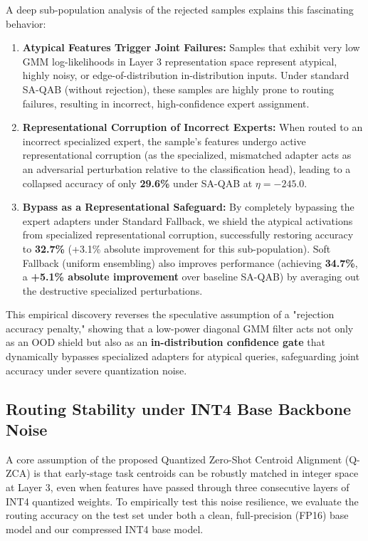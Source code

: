 \documentclass{article}
\theoremstyle{plain}
\theoremstyle{definition}
\theoremstyle{remark}
\begin{document}
A deep sub-population analysis of the rejected samples explains this fascinating behavior:
\begin{enumerate}
    \item \textbf{Atypical Features Trigger Joint Failures:} Samples that exhibit very low GMM log-likelihoods in Layer 3 representation space represent atypical, highly noisy, or edge-of-distribution in-distribution inputs. Under standard SA-QAB (without rejection), these samples are highly prone to routing failures, resulting in incorrect, high-confidence expert assignment.
    \item \textbf{Representational Corruption of Incorrect Experts:} When routed to an incorrect specialized expert, the sample's features undergo active representational corruption (as the specialized, mismatched adapter acts as an adversarial perturbation relative to the classification head), leading to a collapsed accuracy of only \textbf{29.6\%} under SA-QAB at $\eta = -245.0$.
    \item \textbf{Bypass as a Representational Safeguard:} By completely bypassing the expert adapters under Standard Fallback, we shield the atypical activations from specialized representational corruption, successfully restoring accuracy to \textbf{32.7\%} (+3.1\% absolute improvement for this sub-population). Soft Fallback (uniform ensembling) also improves performance (achieving \textbf{34.7\%}, a \textbf{+5.1\% absolute improvement} over baseline SA-QAB) by averaging out the destructive specialized perturbations.
\end{enumerate}
This empirical discovery reverses the speculative assumption of a "rejection accuracy penalty," showing that a low-power diagonal GMM filter acts not only as an OOD shield but also as an \textbf{in-distribution confidence gate} that dynamically bypasses specialized adapters for atypical queries, safeguarding joint accuracy under severe quantization noise.

\subsection{Routing Stability under INT4 Base Backbone Noise}
A core assumption of the proposed Quantized Zero-Shot Centroid Alignment (Q-ZCA) is that early-stage task centroids can be robustly matched in integer space at Layer 3, even when features have passed through three consecutive layers of INT4 quantized weights. To empirically test this noise resilience, we evaluate the routing accuracy on the test set under both a clean, full-precision (FP16) base model and our compressed INT4 base model.
\end{document}
